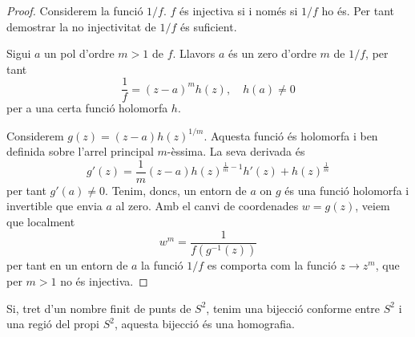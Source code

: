 \documentclass[dvipsnames, svgnames, leqno, a4paper, 12pt]{article}
\begin{document}
        \begin{proof}
            Considerem la funció $1/f$. $f$ és injectiva si i només si $1/f$ ho és. Per tant demostrar la no injectivitat de $1/f$ és suficient.
            
            Sigui $a$ un pol d'ordre $m>1$ de $f$. Llavors $a$ és un zero d'ordre $m$ de $1/f$, per tant 
            \begin{displaymath}
                \frac{1}{f}=(z-a)^mh(z),\quad  h(a)\neq0
            \end{displaymath} 
            per a una certa funció holomorfa $h$.

            Considerem $ g(z)=(z-a)h(z)^{1/m}$. Aquesta funció és holomorfa i ben definida sobre l'arrel principal $m$-èssima. La seva derivada és 
            \begin{displaymath}
                g'(z)=\frac{1}{m}(z-a)h(z)^{\frac{1}{m}-1}h'(z)+h(z)^{\frac{1}{m}}
            \end{displaymath} 
            per tant $g'(a)\neq0$.
            Tenim, doncs, un entorn de $a$ on $g$ és una funció holomorfa i invertible que envia $a$ al zero. Amb el canvi de coordenades $ w  = g(z)$, veiem que localment \begin{displaymath}
                 w ^m = \frac{1}{f(g^{-1}(z))}
            \end{displaymath} 
            per tant en un entorn de $a$ la funció $1/f$ es comporta com la funció $z\to z^m$, que per $m>1$ no és injectiva.
        \end{proof}

        \begin{theorem}
            Si, tret d'un nombre finit de punts de $S^2$, tenim una bijecció conforme entre $S^2$ i una regió del propi $S^2$, aquesta bijecció és una homografia.
        \end{theorem}
\end{document}
